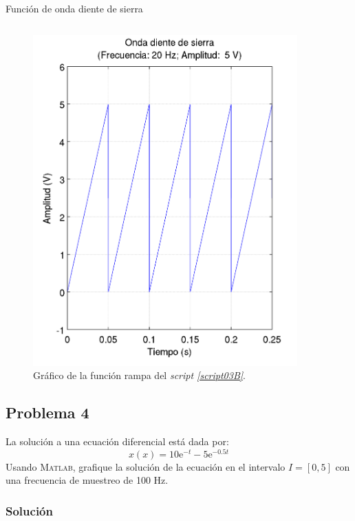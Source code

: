 \documentclass[a4paper,12pt,final]{article}
\begin{document}
      \newpage
      \begin{listing}[H]
        \caption{Función de onda diente de sierra}
        \label{script03B}
        \inputminted{matlab}{./laboratorio_2/saww.m}
      \end{listing}

      \begin{figure}[H]
        \caption{Gráfico de la función rampa del \emph{script \ref{script03B}}.}
        \label{script03Bfigure}
        \includegraphics[height=5in]{./laboratorio_2/problema03_b.png}
      \end{figure}
      \vspace{\fill}

  \newpage
  \subsection*{Problema 4}
    \noindent La solución a una ecuación diferencial está dada por:
    $$x\left(x\right) = 10\mathrm{e}^{-t} - 5\mathrm{e}^{-0.5t}$$
    Usando \textsc{Matlab}, grafique la solución de la ecuación en el intervalo
    $I=\left[0,5\right]$ con una frecuencia de muestreo de 100 Hz.

    \subsubsection*{Solución}
      \begin{listing}[H]
        \caption{}
        \label{script04}
        \inputminted{matlab}{./laboratorio_2/problema04.m}
      \end{listing}
\end{document}
